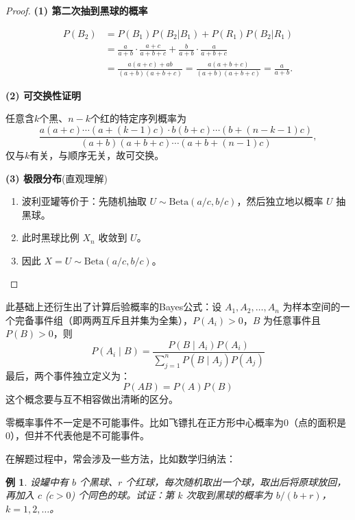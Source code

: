 \documentclass[a4paper]{ctexart}
\newtheorem{example}{例}[section]
\begin{document}
\begin{proof}
    \textbf{(1) 第二次抽到黑球的概率}

    \begin{align*}
    P(B_2)&=P(B_1)P(B_2|B_1)+P(R_1)P(B_2|R_1)\\
    &=\frac{a}{a+b}\cdot\frac{a+c}{a+b+c}+\frac{b}{a+b}\cdot\frac{a}{a+b+c}\\
    &=\frac{a(a+c)+ab}{(a+b)(a+b+c)}=\frac{a(a+b+c)}{(a+b)(a+b+c)}=\frac{a}{a+b}.
    \end{align*}

    \textbf{(2) 可交换性证明}

    任意含$k$个黑、$n-k$个红的特定序列概率为
    \[
    \frac{a(a+c)\cdots(a+(k-1)c)\cdot b(b+c)\cdots(b+(n-k-1)c)}{(a+b)(a+b+c)\cdots(a+b+(n-1)c)},
    \]
    仅与$k$有关，与顺序无关，故可交换。

    \textbf{(3) 极限分布}(直观理解)

    \begin{enumerate}
        \item 波利亚罐等价于：先随机抽取 $U \sim \text{Beta}(a/c, b/c)$，然后独立地以概率 $U$ 抽黑球。
        \item 此时黑球比例 $X_n$ 收敛到 $U$。
        \item 因此 $X = U \sim \text{Beta}(a/c, b/c)$。
    \end{enumerate}
\end{proof}
此基础上还衍生出了计算后验概率的Bayes公式：设 $A_1, A_2, \ldots, A_n$ 为样本空间的一个完备事件组（即两两互斥且并集为全集），$P(A_i) > 0$，$B$ 为任意事件且 $P(B) > 0$，则
\begin{equation}
    P(A_i \mid B) = \frac{P(B \mid A_i) P(A_i)}{\sum_{j=1}^{n} P(B \mid A_j) P(A_j)}
\end{equation}
最后，两个事件独立定义为：
\begin{equation}
    P(AB)=P(A)P(B)
\end{equation}
这个概念要与互不相容做出清晰的区分。
\begin{tipbox}
    零概率事件不一定是不可能事件。比如飞镖扎在正方形中心概率为$0$（点的面积是0），但并不代表他是不可能事件。
\end{tipbox}
在解题过程中，常会涉及一些方法，比如数学归纳法：
\begin{example}
    设罐中有 \( b \) 个黑球、\( r \) 个红球，每次随机取出一个球，取出后将原球放回，再加入 \( c \) (\( c > 0 \)) 个同色的球。试证：第 \( k \) 次取到黑球的概率为 \( b/(b+r) \)，\( k = 1, 2, \dots \)。
\end{example}
\end{document}
